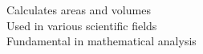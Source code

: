 \documentclass[preview]{standalone}
\begin{document}
Calculates areas and volumes\\Used in various scientific fields\\Fundamental in mathematical analysis\\
\end{document}
